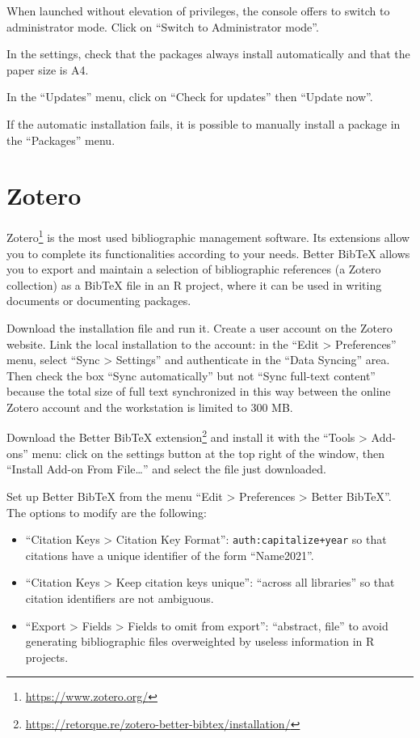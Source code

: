 \documentclass[
  12pt,
  american,
  a4paper,
  extrafontsizes,onecolumn,openright
  ]{memoir}
\providecommand{\tightlist}{%
  \setlength{\itemsep}{0pt}\setlength{\parskip}{0pt}}
\begin{document}
When launched without elevation of privileges, the console offers to switch to administrator mode.
Click on \enquote{Switch to Administrator mode}.

In the settings, check that the packages always install automatically and that the paper size is A4.

In the \enquote{Updates} menu, click on \enquote{Check for updates} then \enquote{Update now}.

If the automatic installation fails, it is possible to manually install a package in the \enquote{Packages} menu.

\hypertarget{sec:Zotero}{%
\section{Zotero}\label{sec:Zotero}}

Zotero\footnote{\url{https://www.zotero.org/}} is the most used bibliographic management software.
Its extensions allow you to complete its functionalities according to your needs.
Better BibTeX allows you to export and maintain a selection of bibliographic references (a Zotero collection) as a BibTeX file in an R project, where it can be used in writing documents or documenting packages.

Download the installation file and run it.
Create a user account on the Zotero website.
Link the local installation to the account: in the \enquote{Edit \textgreater{} Preferences} menu, select \enquote{Sync \textgreater{} Settings} and authenticate in the \enquote{Data Syncing} area.
Then check the box \enquote{Sync automatically} but not \enquote{Sync full-text content} because the total size of full text synchronized in this way between the online Zotero account and the workstation is limited to 300 MB.

Download the Better BibTeX extension\footnote{\url{https://retorque.re/zotero-better-bibtex/installation/}} and install it with the \enquote{Tools \textgreater{} Add-ons} menu: click on the settings button at the top right of the window, then \enquote{Install Add-on From File\ldots{}} and select the file just downloaded.

Set up Better BibTeX from the menu \enquote{Edit \textgreater{} Preferences \textgreater{} Better BibTeX}.
The options to modify are the following:

\begin{itemize}
\tightlist
\item
  \enquote{Citation Keys \textgreater{} Citation Key Format}: \texttt{auth:capitalize+year} so that citations have a unique identifier of the form \enquote{Name2021}.
\item
  \enquote{Citation Keys \textgreater{} Keep citation keys unique}: \enquote{across all libraries} so that citation identifiers are not ambiguous.
\item
  \enquote{Export \textgreater{} Fields \textgreater{} Fields to omit from export}: \enquote{abstract, file} to avoid generating bibliographic files overweighted by useless information in R projects.
\end{itemize}
\end{document}
